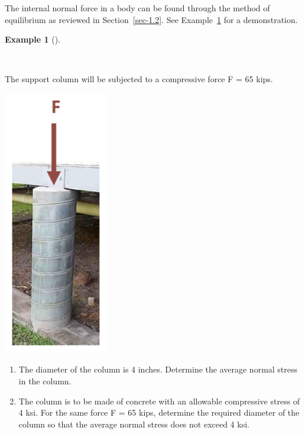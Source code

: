 \documentclass[
  letterpaper,
  DIV=11,
  numbers=noendperiod]{scrreprt}
\theoremstyle{definition}
\newtheorem{example}{Example}[chapter]
\theoremstyle{remark}
\begin{document}
The internal normal force in a body can be found through the method of
equilibrium as reviewed in Section~\ref{sec-1.2}. See
Example~\ref{exm-2.1} for a demonstration.

\begin{tcolorbox}[enhanced jigsaw, left=2mm, toptitle=1mm, breakable, coltitle=black, colbacktitle=quarto-callout-tip-color!10!white, opacitybacktitle=0.6, bottomrule=.15mm, titlerule=0mm, leftrule=.75mm, colframe=quarto-callout-tip-color-frame, bottomtitle=1mm, opacityback=0, title={Example 2.1}, arc=.35mm, colback=white, rightrule=.15mm, toprule=.15mm]

\begin{example}[]\protect\hypertarget{exm-2.1}{}\label{exm-2.1}

~

The support column will be subjected to a compressive force F = 65 kips.

\begin{center}
\includegraphics[width=1.8125in,height=\textheight]{images/Updated CH2 examples/example 2.1 part 1.png}
\end{center}

\begin{enumerate}
\def\labelenumi{\arabic{enumi}.}
\item
  The diameter of the column is 4 inches. Determine the average normal
  stress in the column.
\item
  The column is to be made of concrete with an allowable compressive
  stress of 4 ksi. For the same force F = 65 kips, determine the
  required diameter of the column so that the average normal stress does
  not exceed 4 ksi.
\end{enumerate}


\end{example}
\end{tcolorbox}
\end{document}
